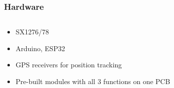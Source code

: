 \documentclass[aspectratio=169]{beamer}
\begin{document}
\begin{frame}[t]
  \frametitle{Hardware}
  \begin{columns}
    \begin{column}{0.66\textwidth}
      \begin{itemize}
        \item SX1276/78
        \medskip
        \item Arduino, ESP32
        \medskip
        \item GPS receivers for position tracking
        \medskip
        \item Pre-built modules with all 3 functions on one PCB
      \end{itemize}
    \end{column}
    \begin{column}{0.33\textwidth}
    \end{column}
  \end{columns}

\end{frame}
\end{document}
